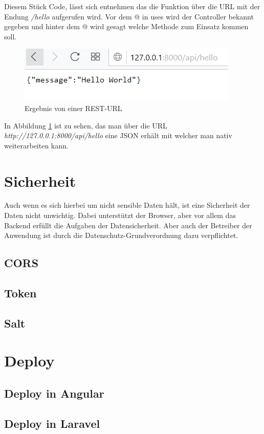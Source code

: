 Diesem Stück Code, lässt sich entnehmen das die Funktion über die \ac{URL} mit der Endung \textit{/hello} aufgerufen wird. Vor dem @ in uses wird der Controller bekannt gegeben und hinter dem @ wird gesagt welche Methode zum Einsatz kommen soll.

\begin{figure}[H]
	\centering
	\includegraphics{content/pictures/restresult.png}
	\caption{ Ergebnis von einer REST-URL}
	\label{fig:restresult}
\end{figure}

In Abbildung \ref{fig:restresult} ist zu sehen, das man über die \ac{URL} \textit{http://127.0.0.1:8000/api/hello} eine \ac{JSON} erhält mit welcher man nativ weiterarbeiten kann.


\section{Sicherheit}
Auch wenn es sich hierbei um nicht sensible Daten hält, ist eine Sicherheit der Daten nicht unwichtig. Dabei unterstützt der Browser, aber vor allem das Backend erfüllt die Aufgaben der Datensicherheit. Aber auch der Betreiber der Anwendung ist durch die Datenschutz-Grundverordnung dazu verpflichtet. \autocite{intersoftconsulting.2018} 

\subsection{CORS}

\subsection{Token}

\subsection{Salt}


\section{Deploy}

\subsection{Deploy in Angular}
\subsection{Deploy in Laravel}
